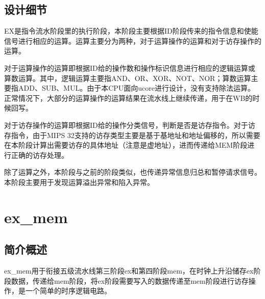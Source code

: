     \subsection{设计细节}
    EX是指令流水阶段里的执行阶段，本阶段主要根据ID阶段传来的指令信息和使能信号进行相应的运算。运算主要分为两种，对于运算操作的运算和对于访存操作的运算。

    对于运算操作的运算即根据ID给的操作数和操作标识信息进行相应的逻辑运算或算数运算。其中，逻辑运算主要指AND、OR、XOR、NOT、NOR；算数运算主要指ADD、SUB、MUL。由于本CPU面向ucore进行设计，没有支持除法运算。正常情况下，大部分的运算操作的运算结果在流水线上继续传递，用于在WB的时候回写。

    对于访存操作的运算即根据ID给的操作分类信号，判断是否是访存指令。对于访存指令，由于MIPS 32支持的访存类型主要是基于基地址和地址偏移的，所以需要在本阶段计算出需要访存的具体地址（注意是虚地址），进而传递给MEM阶段进行正确的访存处理。

    除了运算之外，本阶段与之前的阶段类似，也传递异常信息归总和暂停请求信号。本阶段主要用于发现运算溢出异常和陷入异常。
    
\section{ex\_mem}

    \subsection{简介概述}
    ex\_mem用于衔接五级流水线第三阶段ex和第四阶段mem，在时钟上升沿储存ex阶段数据，传递给mem阶段，将ex阶段需要写入的数据传递至mem阶段进行访存操作，是一个简单的时序逻辑电路。

